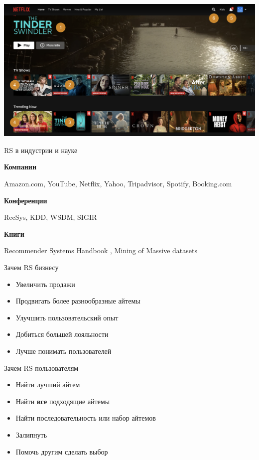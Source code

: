 \documentclass[11pt,aspectratio=169,handout=true]{beamer}
\begin{document}
\begin{frame}{}

\begin{center}
\includegraphics[scale=0.25]{images/netflix-6.png}
\end{center}

\end{frame}

\begin{frame}{RS в индустрии и науке}

{\bf Компании}

Amazon.com, YouTube, Netflix, Yahoo, Tripadvisor, Spotify, Booking.com

\vfill

{\bf Конференции}

RecSys, KDD, WSDM, SIGIR

\vfill

{\bf Книги}

Recommender Systems Handbook \cite{RSHB}, Mining of Massive datasets \cite{MMDS}

\end{frame}

\begin{frame}{Зачем RS бизнесу}

\begin{itemize}[<+->]
\item Увеличить продажи
\item Продвигать более разнообразные айтемы
\item Улучшить пользовательский опыт
\item Добиться большей лояльности
\item Лучше понимать пользователей
\end{itemize}

\end{frame}

\begin{frame}{Зачем RS пользователям}

\begin{itemize}[<+->]
\item Найти лучший айтем
\item Найти {\bf все} подходящие айтемы
\item Найти последовательность или набор айтемов
\item Залипнуть
\item Помочь другим сделать выбор
\end{itemize}

\end{frame}
\end{document}
